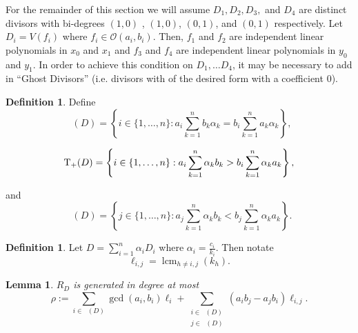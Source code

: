 \documentclass{amsart}
\theoremstyle{plain}
\newtheorem{lem}[thm]{Lemma}
\theoremstyle{definition}
\newtheorem{defn}[thm]{Definition}
\theoremstyle{remark}
\numberwithin{equation}{section}
\newcommand\sco{{\mathscr O}}
\newcommand\bida{a}
\newcommand\bidb{b}
\DeclareMathOperator{\Te}{T_=}
\DeclareMathOperator{\Tp}{T_+}
\DeclareMathOperator{\Tm}{T_-}
\DeclareMathOperator{\lcm}{lcm}
\begin{document}
For the remainder of this section we will assume $D_1, D_2, D_3,$ and $D_4$ are
distinct divisors with bi-degrees $(1,0)$
, $(1,0)$, $(0,1)$, and $(0,1)$ respectively. Let $D_i = V(f_i)$ where
$f_i \in \sco(\bida_i, \bidb_i)$.  
Then, $f_1$ and $f_2$ are independent linear
polynomials in $x_0$ and $x_1$ and $f_3$ and $f_4$ are independent
linear polynomials in $y_0$ and $y_1$.  In order to achieve this condition on
$D_1, \ldots D_4$, it may be necessary to add in ``Ghost Divisors'' (i.e.
divisors with of the desired form with a coefficient $0$).
\begin{defn}
Define 
\begin{equation}
\label{eqn:define-T=(D)}
	\Te(D) = \left\{i \in \{1, \ldots, n\}: \bida_i \sum_{k=1}^n \bidb_k 
\alpha_k = \bidb_i \sum_{k=1}^n \bida_k \alpha_k \right\},
\end{equation}

\begin{equation}
\label{eqn:define-T+(D)}
	\Tp(D) = \left\{ i \in \{1, \ldots, n\}:  \vphantom{\sum_{k = 1}^n} 
	\bida_i \sum_{k = 1}^n \alpha_k \bidb_k > \bidb_i \sum_{k = 1}^n \alpha_k \bida_k 
\right\},
\end{equation}

\noindent
and
\begin{equation}
\label{eqn:define-T-(D)}
	\Tm(D) = \left\{ j \in \{1, \ldots, n\}: \bida_j \sum_{k = 1}^n \alpha_k
	\bidb_k < \bidb_j \sum_{k=1}^n \alpha_k \bida_k \right\}.
\end{equation}
\end{defn}

\begin{defn}\label{def:ell_ij}
Let $D = \sum_{i=1}^n \alpha_i D_i$ where $\alpha_i = \frac{c_i}{k_i}$.
Then notate
\[\ell_{i,j} = \lcm_{h\ne i,j}(k_h).\]
\end{defn}

\begin{lem}
\label{lem:hirz-generators}
$R_D$ is generated in degree at most
\begin{equation}\label{eqn:def-sigma}
	\rho := \sum_{i \in \Te(D)} \gcd(\bida_i, \bidb_i) \ell_i + \sum_{\substack
	{i \in \Tp(D) \\ j\in \Tm(D)}} (\bida_i \bidb_j - \bida_j \bidb_i)
	\ell	_{i,j}.
\end{equation}
\end{lem}
\end{document}
